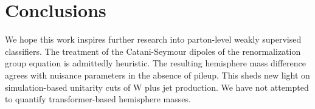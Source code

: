 \section{Conclusions}\label{sec:conclusions}

We hope this work inspires further research into parton-level weakly
supervised classifiers. The treatment of the Catani-Seymour dipoles of
the renormalization group equation is admittedly heuristic. The
resulting hemisphere mass difference agrees with nuisance parameters in
the absence of pileup. This sheds new light on simulation-based
unitarity cuts of W plus jet production. We have not attempted to
quantify transformer-based hemisphere masses.

